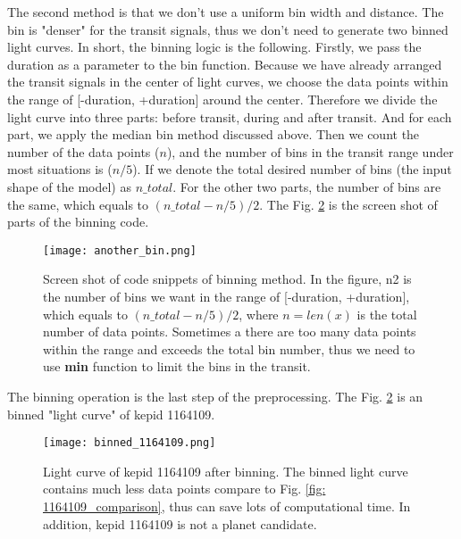       The second method is that we don't use a uniform bin width and distance. The bin 
      is "denser" for the transit signals, thus we don't need to generate two binned light 
      curves. In short, the binning logic is the 
      following. Firstly, we pass the duration as a parameter to the bin function. Because 
      we have already arranged the transit signals in the center of light curves, 
      we choose the data points within the range of [-duration, +duration] around the center.
      Therefore we divide the light curve into three parts: before transit, during and after 
      transit. And for each part, we apply the median bin method discussed above.
      Then we count the number of the data points ($n$), and the number of bins in the 
      transit range under most situations is ($n/5$). If we denote the 
      total desired number of bins (the input shape of the model) as $n\_total$.
      For the other two parts, the number of bins are the same, which equals to 
      $\left(n\_total-n/5\right)/2$. The Fig. \ref{fig: binning_method} is the 
      screen shot of parts of the binning code.

      \begin{figure}[!htp]
        \centering
        \texttt{[image: another\_bin.png]}
        \caption[Screen shot of code snippets of binning method.]
          {Screen shot of code snippets of binning method. In the figure, n2 is the 
          number of bins we want in the range of [-duration, +duration], which equals 
          to $\left(n\_total-n/5\right)/2$, where $n=len(x)$ is the total number of 
          data points. Sometimes a there are too many data points within the range and 
          exceeds the total bin number, thus we need to use \textbf{min} function to 
          limit the bins in the transit.}
        \label{fig: binning_method}
      \end{figure}

      The binning operation is the last step of the preprocessing. 
      The Fig. \ref{fig: binning_method} is an binned "light curve" of kepid 1164109.

      \begin{figure}[!htp]
        \centering
        \texttt{[image: binned\_1164109.png]}
        \caption[Light curve of kepid 1164109 after binning. ]
          {Light curve of kepid 1164109 after binning. The binned light curve 
          contains much less data points compare to Fig. 
          \ref{fig: 1164109_comparison}, thus can save lots of computational time. 
          In addition, kepid 1164109 is not a planet candidate.}
        \label{fig: binning_method}
      \end{figure}

